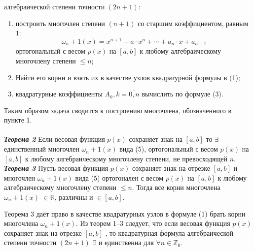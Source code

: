 \documentclass[14pt,a4paper,titlepage]{extarticle}
\begin{document}
алгебраической степени точности $(2n+1)$:
\begin{enumerate}
\item построить многочлен степени $(n +1)$ со старшим коэффициентом, равным $1$:
\begin{equation}
		\omega_n+1 (x) = x^{n+1} + a\cdot x^n + \cdots + a_n \cdot x + a_{n+1}
		\label{(5)}
	\end{equation}
	ортогональный с весом $p(x)$ на $\left[  a, b\right] $ к любому алгебраическому многочлену степени $\leqslant n$;
	\item Найти его корни и взять их в качестве узлов квадратурной формулы в (1);
	\item квадратурные коэффициенты $A_k , k = \overline{0,n}$ вычислить по формуле (3).
\end{enumerate}
Таким образом задача сводится к построению многочлена, обозначенного в пункте 1.
\\
\\
\textit{{\textbf{Теорема 2}}}
Если весовая функция $p(x)$ сохраняет знак на  $\left[  a, b\right] $ то $\exists$ единственный многочлен $\omega_n+1 (x)$ вида (5), ортогональный с весом $p(x)$ на $\left[  a, b\right] $ к любому алгебраическому многочлену
степени, не превосходящей $n$.
\\
\textit{{\textbf{Теорема 3}}}
Пусть весовая функция $p(x)$ сохраняет знак на отрезке $\left[  a, b\right] $ и многочлен $\omega_n+1 (x)$ вида (5) ортогонален с весом $p(x)$ на $\left[  a, b\right] $ к
любому алгебраическому многочлену степени $\leqslant n$. Тогда все корни многочлена $\omega_n+1 (x)$ $\in \mathbb{R}$, различны и $\in \left[  a, b\right] $.

Теорема 3 даёт право в качестве квадратурных узлов в формуле (1) брать корни
многочлена $\omega_n+1 (x)$.
Из теорем 1–3 следует, что если весовая функция $p(x)$ сохраняет знак на отрезке
$\left[  a, b\right] $ , то квадратурная формула алгебраической степени точности $(2n+1)$ $\exists$ и
единственна для $\forall n \in \mathbb{Z}_0$.
\end{document}
